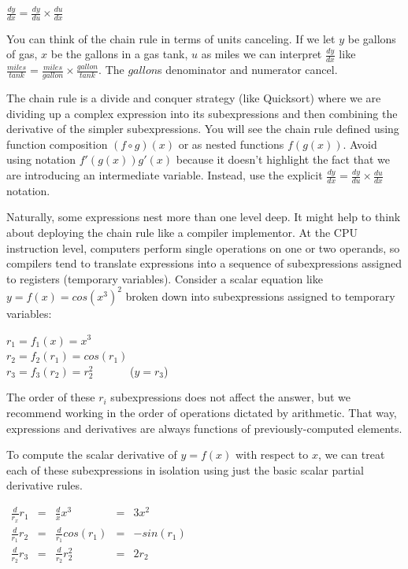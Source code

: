 \documentclass[11pt]{article}
\begin{document}
$\frac{dy}{dx} = \frac{dy}{du} \times \frac{du}{dx}$

You can think of the chain rule in terms of units canceling. If we let $y$ be gallons of gas, $x$ be the gallons in a gas tank, $u$ as miles we can interpret $\frac{dy}{dx}$ like $\frac{miles}{tank} = \frac{miles}{gallon} \times \frac{gallon}{tank}$. The $gallon$s denominator and numerator cancel.
 
The chain rule is a divide and conquer strategy (like Quicksort) where we are dividing up a complex expression into its subexpressions and then combining the derivative of the simpler subexpressions.  You will see the chain rule defined using function composition $(f \circ g)(x)$ or as nested functions $f(g(x))$.  Avoid using notation $f'(g(x))g'(x)$ because it doesn't highlight the fact that we are introducing an intermediate variable. Instead, use the explicit $\frac{dy}{dx} = \frac{dy}{du} \times \frac{du}{dx}$ notation.

Naturally, some expressions nest more than one level deep.  It might help to think about deploying the chain rule like a compiler implementor.   At the CPU instruction level, computers perform single operations on one or two operands, so compilers tend to translate expressions into a sequence of subexpressions assigned to registers (temporary variables). Consider a scalar equation like $y = f(x) = cos(x^3)^2$ broken down into subexpressions assigned to temporary variables:

$r_1 = f_1(x) = x^3$\\
$r_2 = f_2(r_1) = cos(r_1)$\\
$r_3 = f_3(r_2) = r_2^2$ ~~~~~~($y = r_3$)

The order of these $r_i$ subexpressions does not affect the answer, but we recommend working in the order of operations dictated by arithmetic. That way, expressions and derivatives are always functions of previously-computed elements.

To compute the scalar derivative of $y = f(x)$ with respect to $x$, we can treat each of these subexpressions in isolation using just the basic scalar partial derivative rules.

$
\begin{array}{lllll}
\frac{d}{r_x} r_1 & = & \frac{d}{x} x^3 & = & 3x^2\\
\frac{d}{r_1} r_2 & = & \frac{d}{r_1} cos(r_1) & = & -sin(r_1) \\
\frac{d}{r_2} r_3 & = & \frac{d}{r_2} r_2^2 & =& 2r_2\\
\end{array}
$
\end{document}
